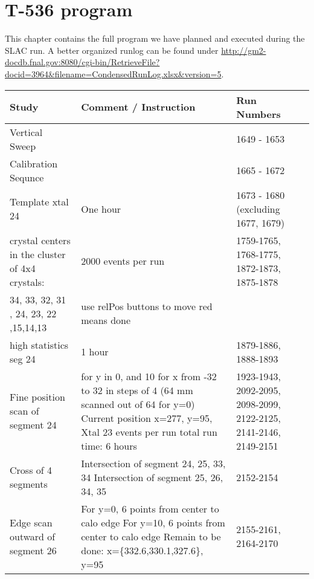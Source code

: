 \chapter{T-536 program}
\label{app:program}

This chapter contains the full program we have planned and executed during the SLAC run.
A better organized runlog can be found under \url{http://gm2-docdb.fnal.gov:8080/cgi-bin/RetrieveFile?docid=3964&filename=CondensedRunLog.xlsx&version=5}.

\begin{landscape}

\begin{longtable}{|p{6cm}|p{10cm}|p{4cm}|} \hline
Study &  Comment / Instruction & Run Numbers \\ \hline
Vertical Sweep &  & 1649 - 1653 \\ \hline
Calibration Sequnce &  & 1665 - 1672 \\ \hline
Template xtal 24 & One hour & 1673 - 1680 (excluding 1677, 1679) \\ \hline
crystal centers in the \newline cluster of 4x4 crystals: & 2000 events per run & 1759-1765, 1768-1775, 1872-1873, 1875-1878\\ \hline
34, 33, 32, 31 \newline 25, 24, 23, 22 \newline 16,15,14,13 & use relPos buttons to move \newline red means done & \\ \hline
high statistics seg 24 & 1 hour & 1879-1886, 1888-1893\\ \hline
Fine position scan of segment 24 & for y in 0, and 10 \newline for x from -32 to 32 in steps of 4  \newline (64 mm scanned out of 64 for y=0) \newline Current position x=277, y=95, Xtal 23 \newline 3000 events per run \newline total run time: 6 hours  & 1923-1943, 2092-2095, 2098-2099, 2122-2125, 2141-2146, 2149-2151\\ \hline
Cross of 4 segments & Intersection of segment 24, 25, 33, 34  \newline Intersection of segment 25, 26, 34, 35 & 2152-2154\\ \hline
Edge scan outward of segment 26 & For y=0, 6 points from center to calo edge \newline For y=10, 6 points from center to calo edge \newline Remain to be done: x=\{332.6,330.1,327.6\}, y=95 & 2155-2161, 2164-2170\\ \hline

\end{longtable}
\end{landscape}

